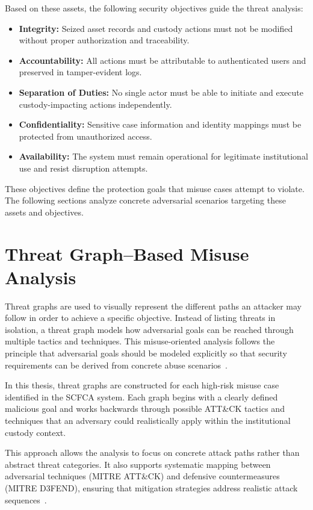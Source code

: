 \documentclass[12pt,a4paper]{report}
\begin{document}
Based on these assets, the following security objectives guide the threat analysis:

\begin{itemize}
    \item \textbf{Integrity:} Seized asset records and custody actions must not be modified without proper authorization and traceability.
    \item \textbf{Accountability:} All actions must be attributable to authenticated users and preserved in tamper-evident logs.
    \item \textbf{Separation of Duties:} No single actor must be able to initiate and execute custody-impacting actions independently.
    \item \textbf{Confidentiality:} Sensitive case information and identity mappings must be protected from unauthorized access.
    \item \textbf{Availability:} The system must remain operational for legitimate institutional use and resist disruption attempts.
\end{itemize}

These objectives define the protection goals that misuse cases attempt to violate. The following sections analyze concrete adversarial scenarios targeting these assets and objectives.

\section{Threat Graph–Based Misuse Analysis}

Threat graphs are used to visually represent the different paths an attacker may follow in order to achieve a specific objective. Instead of listing threats in isolation, a threat graph models how adversarial goals can be reached through multiple tactics and techniques.
This misuse-oriented analysis follows the principle that adversarial goals should be modeled explicitly so that security requirements can be derived from concrete abuse scenarios~\cite{Sindre2001,Choi2006}.

In this thesis, threat graphs are constructed for each high-risk misuse case identified in the SCFCA system. Each graph begins with a clearly defined malicious goal and works backwards through possible ATT\&CK tactics and techniques that an adversary could realistically apply within the institutional custody context.

This approach allows the analysis to focus on concrete attack paths rather than abstract threat categories. It also supports systematic mapping between adversarial techniques (MITRE ATT\&CK) and defensive countermeasures (MITRE D3FEND), ensuring that mitigation strategies address realistic attack sequences~\cite{MITREATTACK,MITRED3FEND}.
\end{document}
